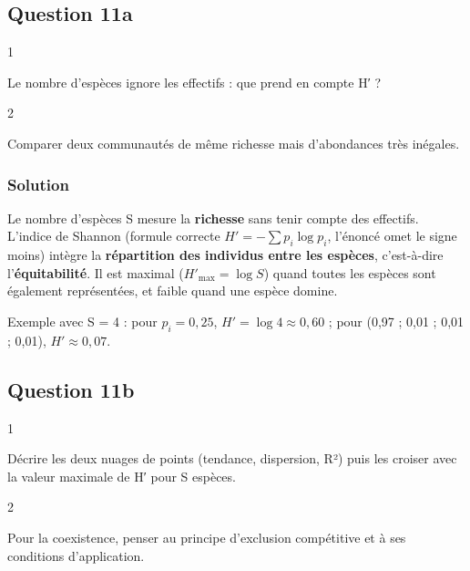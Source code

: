 \documentclass[11pt,a4paper]{article}
\begin{document}
\hypertarget{question-11a}{%
\subsection{Question 11a}\label{question-11a}}

\begin{indication}{1}

Le nombre d'espèces ignore les effectifs : que prend en compte H′ ?

\end{indication}

\begin{indication}{2}

Comparer deux communautés de même richesse mais d'abondances très inégales.

\end{indication}

\hypertarget{solution-29}{%
\subsubsection{Solution}\label{solution-29}}

Le nombre d'espèces S mesure la \textbf{richesse} sans tenir compte des effectifs. L'indice de Shannon (formule correcte \(H'=-\sum p_i\log p_i\), l'énoncé omet le signe moins) intègre la \textbf{répartition des individus entre les espèces}, c'est-à-dire l'\textbf{équitabilité}. Il est maximal (\(H'_{\max}=\log S\)) quand toutes les espèces sont également représentées, et faible quand une espèce domine.

Exemple avec S = 4 : pour \(p_i=0{,}25\), \(H'=\log 4\approx0{,}60\) ; pour (0,97 ; 0,01 ; 0,01 ; 0,01), \(H'\approx0{,}07\).

\hypertarget{question-11b}{%
\subsection{Question 11b}\label{question-11b}}

\begin{indication}{1}

Décrire les deux nuages de points (tendance, dispersion, R²) puis les croiser avec la valeur maximale de H′ pour S espèces.

\end{indication}

\begin{indication}{2}

Pour la coexistence, penser au principe d'exclusion compétitive et à ses conditions d'application.

\end{indication}
\end{document}
